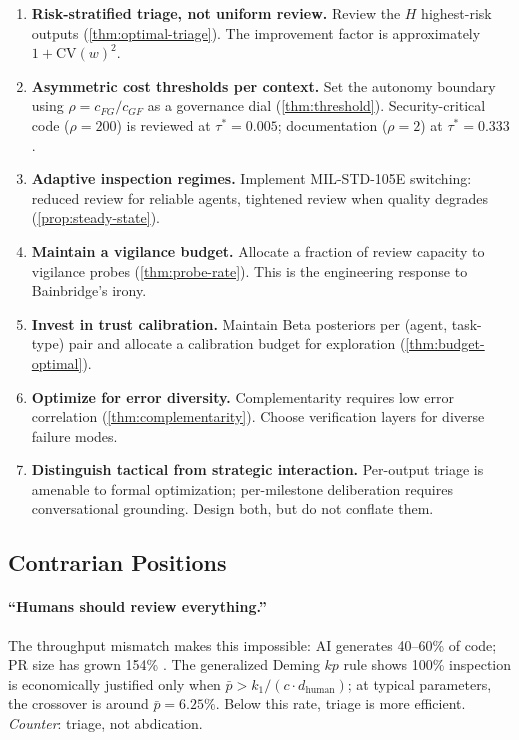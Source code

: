 \documentclass[11pt, a4paper]{googledeepmind}
\begin{document}
\begin{enumerate}[leftmargin=*,nosep]
\item \textbf{Risk-stratified triage, not uniform review.} Review the $H$ highest-risk outputs (\ref{thm:optimal-triage}). The improvement factor is approximately $1 + \text{CV}(w)^2$.

\item \textbf{Asymmetric cost thresholds per context.} Set the autonomy boundary using $\rho = c_{FG}/c_{GF}$ as a governance dial (\ref{thm:threshold}). Security-critical code ($\rho = 200$) is reviewed at $\tau^* = 0.005$; documentation ($\rho = 2$) at $\tau^* = 0.333$.

\item \textbf{Adaptive inspection regimes.} Implement MIL-STD-105E switching: reduced review for reliable agents, tightened review when quality degrades (\ref{prop:steady-state}).

\item \textbf{Maintain a vigilance budget.} Allocate a fraction of review capacity to vigilance probes (\ref{thm:probe-rate}). This is the engineering response to Bainbridge's irony.

\item \textbf{Invest in trust calibration.} Maintain Beta posteriors per (agent, task-type) pair and allocate a calibration budget for exploration (\ref{thm:budget-optimal}).

\item \textbf{Optimize for error diversity.} Complementarity requires low error correlation (\ref{thm:complementarity}). Choose verification layers for diverse failure modes.

\item \textbf{Distinguish tactical from strategic interaction.} Per-output triage is amenable to formal optimization; per-milestone deliberation requires conversational grounding. Design both, but do not conflate them.
\end{enumerate}

\subsection{Contrarian Positions}

\paragraph{``Humans should review everything.''} The throughput mismatch makes this impossible: AI generates 40--60\% of code; PR size has grown 154\% \citep{dora2025}. The generalized Deming $kp$ rule shows 100\% inspection is economically justified only when $\bar{p} > k_1/(c \cdot d_{\text{human}})$; at typical parameters, the crossover is around $\bar{p} = 6.25\%$. Below this rate, triage is more efficient. \emph{Counter}: triage, not abdication.
\end{document}
